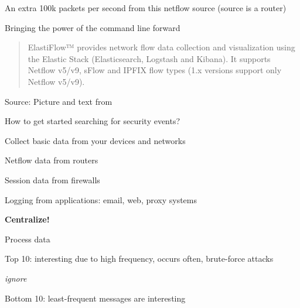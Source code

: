 \documentclass[Screen16to9,17pt]{foils}
\begin{document}





\centerline{An extra 100k packets per second from this netflow source (source is a router)}



\centerline{Bringing the power of the command line forward}



\begin{quote}
  ElastiFlow™ provides network flow data collection and visualization using the Elastic Stack (Elasticsearch, Logstash and Kibana). It supports Netflow v5/v9, sFlow and IPFIX flow types (1.x versions support only Netflow v5/v9).
\end{quote}
Source: Picture and text from  \\




\begin{list1}
\item How to get started searching for security events?
\item Collect basic data from your devices and networks
\begin{list2}
\item Netflow data from routers
\item Session data from firewalls
\item Logging from applications: email, web, proxy systems
\end{list2}
\item {\bf Centralize!}
\item Process data
\begin{list2}
\item Top 10: interesting due to high frequency, occurs often, brute-force attacks
\item {\it ignore}
\item Bottom 10: least-frequent messages are interesting
\end{list2}
\end{list1}
\end{document}
